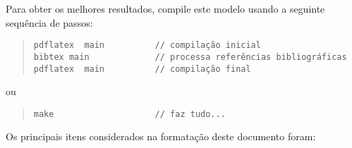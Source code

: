 Para obter os melhores resultados, compile este modelo usando a seguinte sequência de passos:

\begin{quote}
\begin{footnotesize}
\begin{verbatim}
pdflatex  main          // compilação inicial
bibtex main             // processa referências bibliográficas
pdflatex  main          // compilação final
\end{verbatim}
\end{footnotesize}
\end{quote}

ou

\begin{quote}
\begin{footnotesize}
\begin{verbatim}
make                    // faz tudo...
\end{verbatim}
\end{footnotesize}
\end{quote}

Os principais itens considerados na formatação deste documento foram:

